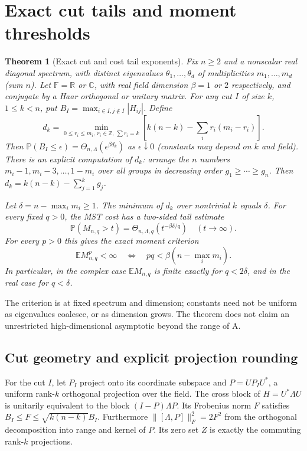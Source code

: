 \documentclass[11pt]{article}
\newtheorem{theorem}{Theorem}
\begin{document}
\section{Exact cut tails and moment thresholds}\label{exact-cut-tails-and-moment-thresholds}

\begin{theorem}[Exact cut and cost tail exponents] Fix \(n\ge2\) and a nonscalar real diagonal spectrum, with distinct eigenvalues \(\theta_1,\ldots,\theta_d\) of multiplicities \(m_1,\ldots,m_d\) (sum \(n\)). Let \(\mathbb F=\mathbb R\) or \(\mathbb C\), with real field dimension \(\beta=1\) or \(2\) respectively, and conjugate by a Haar orthogonal or unitary matrix. For any cut \(I\) of size \(k\), \(1\le k<n\), put \(B_I=\max_{i\in I,j\notin I}|H_{ij}|\). Define \[d_k=\min_{0\le r_i\le m_i,\,r_i\in\mathbb Z,\,\sum r_i=k}\left[k(n-k)-\sum_i r_i(m_i-r_i)\right].\] Then \(\mathbb P(B_I\le\epsilon)=\Theta_{n,\Lambda}(\epsilon^{\beta d_k})\) as \(\epsilon\downarrow0\) (constants may depend on \(k\) and field). There is an explicit computation of \(d_k\): arrange the \(n\) numbers \(m_i-1,m_i-3,\ldots,1-m_i\) over all groups in decreasing order \(g_1\ge\cdots\ge g_n\). Then \(d_k=k(n-k)-\sum_{j=1}^k g_j\).

Let \(\delta=n-\max_i m_i\ge1\). The minimum of \(d_k\) over nontrivial \(k\) equals \(\delta\). For every fixed \(q>0\), the MST cost has a two-sided tail estimate \[\mathbb P(M_{n,q}>t)=\Theta_{n,\Lambda,q}(t^{-\beta\delta/q})\quad(t\to\infty).\] For every \(p>0\) this gives the exact moment criterion \[\mathbb E M_{n,q}^{p}<\infty \quad\Longleftrightarrow\quad p q<\beta(n-\max_i m_i).\] In particular, in the complex case \(\mathbb E M_{n,q}\) is finite exactly for \(q<2\delta\), and in the real case for \(q<\delta\). \end{theorem}

The criterion is at fixed spectrum and dimension; constants need not be uniform as eigenvalues coalesce, or as dimension grows. The theorem does not claim an unrestricted high-dimensional asymptotic beyond the range of A.

\subsection{Cut geometry and explicit projection rounding}\label{cut-geometry-and-explicit-projection-rounding}

For the cut \(I\), let \(P_I\) project onto its coordinate subspace and \(P=U P_I U^*\), a uniform rank-\(k\) orthogonal projection over the field. The cross block of \(H=U^*\Lambda U\) is unitarily equivalent to the block \((I-P)\Lambda P\). Its Frobenius norm \(F\) satisfies \(B_I\le F\le\sqrt{k(n-k)} B_I\). Furthermore \(\|[\Lambda,P]\|_F^2=2F^2\) from the orthogonal decomposition into range and kernel of \(P\). Its zero set \(Z\) is exactly the commuting rank-\(k\) projections.
\end{document}
